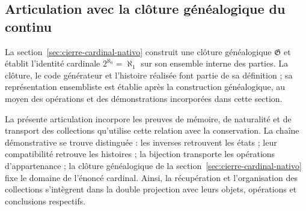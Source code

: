 \subsection{Articulation avec la clôture généalogique du continu}
La section~\ref{sec:cierre-cardinal-nativo} construit une clôture
généalogique \(\mathfrak G\) et établit l’identité cardinale
\(2^{\aleph_0}=\aleph_1\) sur son ensemble interne des parties. La clôture,
le code générateur et l’histoire réalisée font partie de sa
définition ; sa représentation ensembliste est établie après la
construction généalogique, au moyen des opérations et des démonstrations
incorporées dans cette section.

La présente articulation incorpore les preuves de mémoire,
de naturalité et de transport des collections qu’utilise cette relation avec
la conservation. La chaîne démonstrative se trouve distinguée :
les inverses retrouvent les états ; leur compatibilité retrouve les
histoires ; la bijection transporte les opérations d’appartenance ;
la clôture généalogique de la section~\ref{sec:cierre-cardinal-nativo} fixe le domaine
de l’énoncé cardinal. Ainsi, la récupération et l’organisation
des collections s’intègrent dans la double projection avec leurs
objets, opérations et conclusions respectifs.
